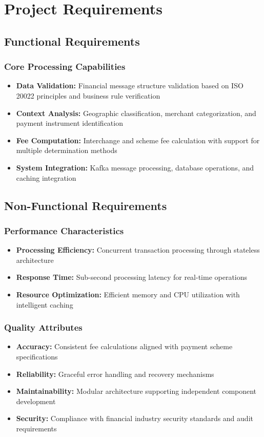 \section{Project Requirements}

\subsection{Functional Requirements}

\subsubsection{Core Processing Capabilities}
\begin{itemize}
    \item \textbf{Data Validation:} Financial message structure validation based on ISO 20022 principles and business rule verification
    \item \textbf{Context Analysis:} Geographic classification, merchant categorization, and payment instrument identification
    \item \textbf{Fee Computation:} Interchange and scheme fee calculation with support for multiple determination methods
    \item \textbf{System Integration:} Kafka message processing, database operations, and caching integration
\end{itemize}

\subsection{Non-Functional Requirements}

\subsubsection{Performance Characteristics}
\begin{itemize}
    \item \textbf{Processing Efficiency:} Concurrent transaction processing through stateless architecture
    \item \textbf{Response Time:} Sub-second processing latency for real-time operations
    \item \textbf{Resource Optimization:} Efficient memory and CPU utilization with intelligent caching
\end{itemize}

\subsubsection{Quality Attributes}
\begin{itemize}
    \item \textbf{Accuracy:} Consistent fee calculations aligned with payment scheme specifications
    \item \textbf{Reliability:} Graceful error handling and recovery mechanisms
    \item \textbf{Maintainability:} Modular architecture supporting independent component development
    \item \textbf{Security:} Compliance with financial industry security standards and audit requirements
\end{itemize}
